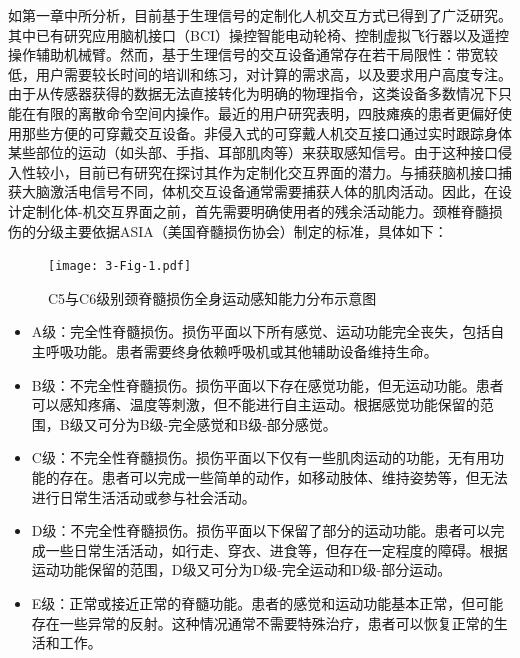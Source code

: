 如第一章中所分析，目前基于生理信号的定制化人机交互方式已得到了广泛研究。其中已有研究应用脑机接口（BCI）操控智能电动轮椅\cite{cruzSelfPacedBCICollaborative2021}、控制虚拟飞行器\cite{krygerFlightSimulationUsing2017}以及遥控操作辅助机械臂\cite{gilliniAssistiveSharedControl2021}。然而，基于生理信号的交互设备通常存在若干局限性：带宽较低，用户需要较长时间的培训和练习，对计算的需求高，以及要求用户高度专注。由于从传感器获得的数据无法直接转化为明确的物理指令，这类设备多数情况下只能在有限的离散命令空间内操作。最近的用户研究表明，四肢瘫痪的患者更偏好使用那些方便的可穿戴交互设备\cite{zhangUnderstandingInteractionsSmart2022}。非侵入式的可穿戴人机交互接口通过实时跟踪身体某些部位的运动（如头部、手指、耳部肌肉等）来获取感知信号。由于这种接口侵入性较小，目前已有研究在探讨其作为定制化交互界面的潜力\cite{miehlbradtDatadrivenBodyMachine2018a,zhouNonInvasiveHumanMachineInterface2022}。与捕获脑机接口捕获大脑激活电信号不同，体机交互设备通常需要捕获人体的肌肉活动。因此，在设计定制化体-机交互界面之前，首先需要明确使用者的残余活动能力。颈椎脊髓损伤的分级主要依据ASIA（美国脊髓损伤协会）制定的标准\cite{SpinalCordInjury}，具体如下：

\begin{figure}[htb]
    \centering
    \texttt{[image: 3-Fig-1.pdf]}
    \caption{C5与C6级别颈脊髓损伤全身运动感知能力分布示意图}
    \label{fig:3-1}
\end{figure}    

\begin{itemize}
\item A级：完全性脊髓损伤。损伤平面以下所有感觉、运动功能完全丧失，包括自主呼吸功能。患者需要终身依赖呼吸机或其他辅助设备维持生命。
\item B级：不完全性脊髓损伤。损伤平面以下存在感觉功能，但无运动功能。患者可以感知疼痛、温度等刺激，但不能进行自主运动。根据感觉功能保留的范围，B级又可分为B级-完全感觉和B级-部分感觉。
\item C级：不完全性脊髓损伤。损伤平面以下仅有一些肌肉运动的功能，无有用功能的存在。患者可以完成一些简单的动作，如移动肢体、维持姿势等，但无法进行日常生活活动或参与社会活动。
\item D级：不完全性脊髓损伤。损伤平面以下保留了部分的运动功能。患者可以完成一些日常生活活动，如行走、穿衣、进食等，但存在一定程度的障碍。根据运动功能保留的范围，D级又可分为D级-完全运动和D级-部分运动。
\item E级：正常或接近正常的脊髓功能。患者的感觉和运动功能基本正常，但可能存在一些异常的反射。这种情况通常不需要特殊治疗，患者可以恢复正常的生活和工作。
\end{itemize}

